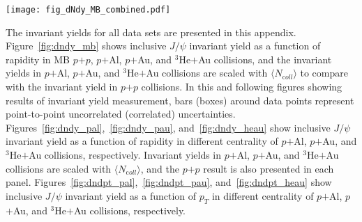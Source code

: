 \documentclass[twocolumn,letterpaper,aps,prc,longbibliography,superscriptaddress,nofootinbib,floatfix]{revtex4-1}
\newcommand{\pt}{\mbox{$p_T$}\xspace}
\newcommand{\meanncoll}{\mbox{$\langle N_{\mathrm coll} \rangle$}\xspace}
\newcommand{\pp}{\mbox{$p$$+$$p$}\xspace}
\newcommand{\pau}{\mbox{$p$$+$Au}\xspace}
\newcommand{\pal}{\mbox{$p$$+$Al}\xspace}
\newcommand{\heau}{\mbox{$^{3}$He$+$Au}\xspace}
\newcommand{\jpsi}{\mbox{$J/\psi$}\xspace}
\begin{document}

\begin{figure*}[htb]
\texttt{[image: fig\_dNdy\_MB\_combined.pdf]}
\caption{\label{fig:dndy_mb}
\jpsi invariant yield as a function of $y$ in MB \pp, \pal, \pau, and 
\heau collisions. Bars (boxes) around data points represents 
point-to-point uncorrelated (correlated) uncertainties.  There is also a 
global uncertainty of 10.1\%, 11.5\%, 12.1\% and 12.2\% corresponding to 
\pp, \pal, \pau and \heau yields.}
\end{figure*}

The invariant yields for all data sets are presented in this appendix. 
Figure~\ref{fig:dndy_mb} shows inclusive \jpsi invariant yield as a 
function of rapidity in MB \pp, \pal, \pau, and \heau collisions, and 
the invariant yields in \pal, \pau, and \heau collisions are scaled with 
\meanncoll to compare with the invariant yield in \pp collisions. In 
this and following figures showing results of invariant yield 
measurement, bars (boxes) around data points represent point-to-point 
uncorrelated (correlated) uncertainties. 
Figures~\ref{fig:dndy_pal},~\ref{fig:dndy_pau}, and~\ref{fig:dndy_heau} 
show inclusive \jpsi invariant yield as a function of rapidity in 
different centrality of \pal, \pau, and \heau collisions, respectively. 
Invariant yields in \pal, \pau, and \heau collisions are scaled with 
\meanncoll, and the \pp result is also presented in each panel. 
Figures~\ref{fig:dndpt_pal},~\ref{fig:dndpt_pau}, 
and~\ref{fig:dndpt_heau} show inclusive \jpsi invariant yield as a 
function of \pt in different centrality of \pal, \pau, and \heau 
collisions, respectively.
\end{document}
